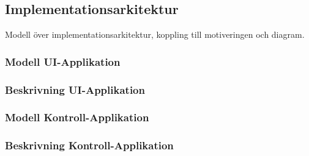 \subsection{Implementationsarkitektur}
Modell över implementationsarkitektur, koppling till motiveringen och diagram.

\subsubsection{Modell UI-Applikation}

\subsubsection{Beskrivning UI-Applikation}

\subsubsection{Modell Kontroll-Applikation}

\subsubsection{Beskrivning Kontroll-Applikation}
